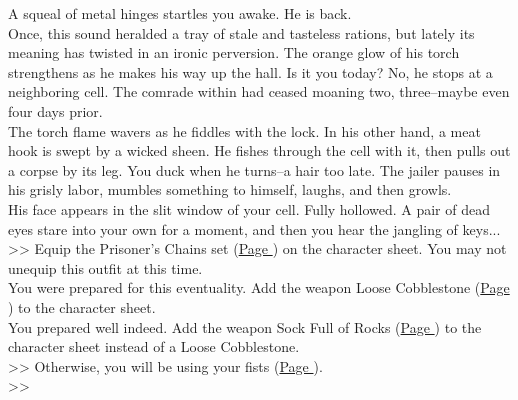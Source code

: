 A squeal of metal hinges startles you awake. He is back.\\

Once, this sound heralded a tray of stale and tasteless rations, but lately its meaning has twisted in an ironic perversion. The orange glow of his torch strengthens as he makes his way up the hall. Is it you today? No, he stops at a neighboring cell. The comrade within had ceased moaning two, three--maybe even four days prior.\\

The torch flame wavers as he fiddles with the lock. In his other hand, a meat hook is swept by a wicked sheen. He fishes through the cell with it, then pulls out a corpse by its leg. You duck when he turns--a hair too late. The jailer pauses in his grisly labor, mumbles something to himself, laughs, and then growls.\\

His face appears in the slit window of your cell. Fully hollowed. A pair of dead eyes stare into your own for a moment, and then you hear the jangling of keys...\\

>> Equip the Prisoner’s Chains set (\hyperlink{Prisoner Chains}{Page \pageref{Prisoner Chains}}) on the character sheet. You may not unequip this outfit at this time.\\
 You were prepared for this eventuality. Add the weapon Loose Cobblestone (\hyperlink{Loose Cobblestone}{Page \pageref{Loose Cobblestone}}) to the character sheet.\\
 You prepared well indeed. Add the weapon Sock Full of Rocks (\hyperlink{Sock Full of Rocks}{Page \pageref{Sock Full of Rocks}}) to the character sheet instead of a Loose Cobblestone.\\
>> Otherwise, you will be using your fists (\hyperlink{Fist}{Page \pageref{Fist}}).\\

>>